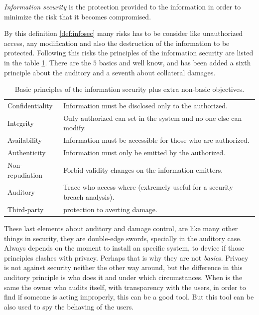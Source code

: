 \documentclass[10pt,a4paper,twoside]{llncs}
\begin{document}
\begin{definition}\label{def:infosec}
    \emph{Information security} is the protection provided to the information in order to minimize the risk that it becomes compromised.
\end{definition}

By this definition \ref{def:infosec} many risks has to be consider like unauthorized access, any modification and also the destruction of the information to be protected. Following this risks the principles of the information security are listed in the table \ref{tab:infosec}. There are the $5$ basics and well know, and has been added a sixth principle about the auditory and a seventh about collateral damages.

\begin{table}[h]
    \begin{center}
        \begin{tabular}{|l|l|}
            \hline
            Confidentiality & Information must be disclosed only to the authorized. \\
            Integrity & Only authorized can set in the system and no one else can modify. \\
            Availability & Information must be accessible for those who are authorized. \\
            Authenticity & Information must only be emitted by the authorized. \\
            Non-repudiation & Forbid validity changes on the information emitters. \\
            \hline
            Auditory & Trace who access where (extremely useful for a security breach analysis). \\
            Third-party & protection to averting damage. \\
            \hline
        \end{tabular}
        \caption{Basic principles of the information security plus extra non-basic objectives.}\label{tab:infosec}
    \end{center}
\end{table}

These last elements about auditory and damage control, are like many other things in security, they are double-edge swords, specially in the auditory case. Always depends on the moment to install an specific system, to device if those principles clashes with privacy. Perhaps that is why they are not \emph{basic}s. Privacy is not against security neither the other way around, but the difference in this auditory principle is who does it and under which circumstances. When is the same the owner who audits itself, with transparency with the users, in order to find if someone is acting improperly, this can be a good tool. But this tool can be also used to spy the behaving of the users.
\end{document}
